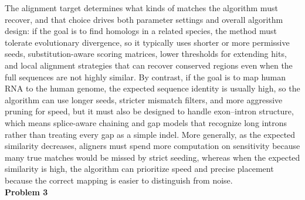 \documentclass{article}
\begin{document}
The alignment target determines what kinds of matches the algorithm must recover, and that choice drives both parameter settings and overall algorithm design: if the goal is to find homologs in a related species, the method must tolerate evolutionary divergence, so it typically uses shorter or more permissive seeds, substitution-aware scoring matrices, lower thresholds for extending hits, and local alignment strategies that can recover conserved regions even when the full sequences are not highly similar. By contrast, if the goal is to map human RNA to the human genome, the expected sequence identity is usually high, so the algorithm can use longer seeds, stricter mismatch filters, and more aggressive pruning for speed, but it must also be designed to handle exon–intron structure, which means splice-aware chaining and gap models that recognize long introns rather than treating every gap as a simple indel. More generally, as the expected similarity decreases, aligners must spend more computation on sensitivity because many true matches would be missed by strict seeding, whereas when the expected similarity is high, the algorithm can prioritize speed and precise placement because the correct mapping is easier to distinguish from noise.\\
\newpage
\textbf{Problem 3}\\
\end{document}
